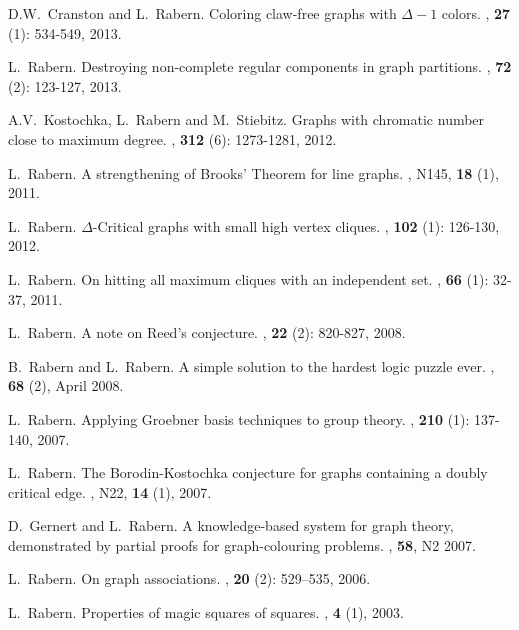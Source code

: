 \documentclass[10pt]{article}
\begin{document}
\begin{enumerate}[{[}1{]}]
\item D.W.~Cranston and L.~Rabern.
\newblock Coloring claw-free graphs with $\Delta - 1$ colors.
, \textbf{27} (1): 534-549, 2013.

\item L.~Rabern.
\newblock Destroying non-complete regular components in graph partitions.
, \textbf{72} (2): 123-127, 2013.

\item A.V.~Kostochka, L.~Rabern and M.~Stiebitz.
\newblock Graphs with chromatic number close to maximum degree.
, \textbf{312} (6): 1273-1281, 2012.

\item L.~Rabern.
\newblock A strengthening of Brooks' Theorem for line graphs.
, N145, \textbf{18} (1), 2011.

\item L.~Rabern.
\newblock $\Delta$-Critical graphs with small high vertex cliques.
, \textbf{102} (1): 126-130, 2012.

\item L.~Rabern. 
\newblock On hitting all maximum cliques with an independent set.
, \textbf{66} (1): 32-37, 2011.

\item L.~Rabern.
\newblock A note on Reed's conjecture.
, \textbf{22} (2): 820-827, 2008.

\item
B.~Rabern and L.~Rabern.
\newblock A simple solution to the hardest logic puzzle ever. 
, \textbf{68} (2), April 2008.

\item L.~Rabern.
\newblock Applying Groebner basis techniques to group theory.
, \textbf{210} (1): 137-140, 2007.

\item
L.~Rabern.
\newblock The Borodin-Kostochka conjecture for graphs containing a doubly critical edge.
, N22, \textbf{14} (1), 2007.

\item
D.~Gernert and L.~Rabern.
\newblock A knowledge-based system for graph theory, demonstrated by partial proofs for graph-colouring problems.
, \textbf{58}, N2 2007.

\item L.~Rabern.
\newblock On graph associations.
, \textbf{20}  (2): 529--535,
  2006.

\item L.~Rabern.
\newblock Properties of magic squares of squares.
, \textbf{4}
  (1), 2003. 
\end{enumerate}
\end{document}

